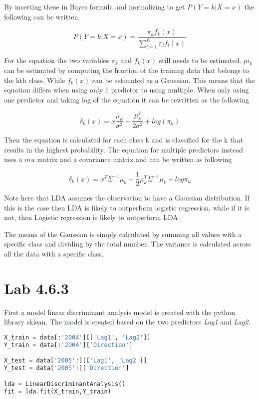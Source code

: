 By inserting these in Bayes formula and normalizing to get $P(Y=k|X=x)$ the following can be written.

\begin{equation}
	P(Y=k|X = x) = \dfrac{\pi_k f_k(x)}{\sum_{l=1}^{K} \pi_l f_l(x)}
\end{equation}

For the equation the two variables $\pi_k$ and $f_k(x)$ still needs to be estimated. $pi_k$ can be estimated by computing the fraction of the training data that belongs to the kth class. While $f_k(x)$ can be estimated as a Gaussian. This means that the equation differs when using only 1 predictor to using multiple. When only using one predictor and taking log of the equation it can be rewritten as the following

\begin{equation}
	\delta_k(x) = x  \dfrac{\mu_k}{\sigma^2} - \dfrac{\mu_k^2}{2\sigma^2} + log(\pi_k)
\end{equation}

Then the equation is calculated for each class k and is classified for the k that results in the highest probability. The equation for multiple predictors instead uses a $mu$ matrix and a covariance matrix and can be written as following

\begin{equation}
	\delta_k(x) = x^T \Sigma^{-1} \mu_k -  \frac{1}{2} \mu_k^{T} \Sigma^{-1} \mu_k + log \pi_k
\end{equation}

Note here that LDA assumes the observation to have a Gaussian distribution. If this is the case then LDA is likely to outperform logistic regression, while if it is not, then Logistic regression is likely to outperform LDA. 

The means of the Gaussian is simply calculated by summing all values with a specific class and dividing by the total number.
The variance is calculated across all the data with a specific class.

\section{Lab 4.6.3}
First a model linear discriminant analysis model is created with the python library sklean. The model is created based on the two predictors \emph{Lag1} and \emph{Lag2}. 

\begin{lstlisting}[language=Python, label=lst:ldaModel, caption=creating linear discriminant analysis model sklearn]
X_train = data[:'2004'][['Lag1', 'Lag2']]
Y_train = data[:'2004']['Direction']

X_test = data['2005':][['Lag1', 'Lag2']]
Y_test = data['2005':]['Direction']

lda = LinearDiscriminantAnalysis()
fit = lda.fit(X_train,Y_train)
\end{lstlisting}

